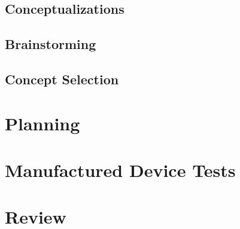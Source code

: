 \documentclass{article}
\begin{document}
\subsection{Conceptualizations}

\subsection{Brainstorming}

\subsection{Concept Selection}

\newpage

\section{Planning}

\newpage

\section{Manufactured Device Tests}


\section{Review}





\end{document}
